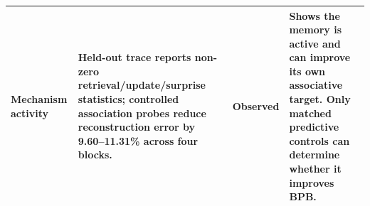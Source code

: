 \documentclass[10pt,twocolumn]{article}
\begin{document}
\begin{table}[!t]
\begin{tabularx}{\textwidth}{@{}>{\raggedright\arraybackslash}p{}>{\raggedright\arraybackslash}p{}>{\centering\arraybackslash}p{}>{\raggedright\arraybackslash}X@{}}
Mechanism activity & Held-out trace reports non-zero retrieval/update/surprise statistics; controlled association probes reduce reconstruction error by 9.60--11.31\% across four blocks. & Observed & Shows the memory is active and can improve its own associative target. Only matched predictive controls can determine whether it improves BPB.\\
\bottomrule
\end{tabularx}
\end{table}
\end{document}

